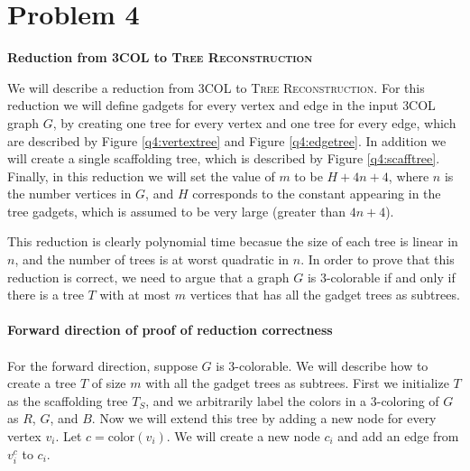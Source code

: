 \newcommand{\tr}{\textsc{Tree Reconstruction}\xspace}
\newcommand{\tc}{\textsc{3COL}\xspace}

\section*{Problem 4}

{\bf Reduction from \tc to \tr}

We will describe a reduction from \tc to \tr. For this reduction we
will define gadgets for every vertex and edge in the input \tc graph
$G$, by creating one tree for every vertex and one tree for every
edge, which are described by Figure \ref{q4:vertextree}
and Figure \ref{q4:edgetree}.
In addition we will create a single scaffolding tree, which is
described by Figure \ref{q4:scafftree}. Finally, in this
reduction we will set the value of $m$ to be $H + 4n + 4$,
where $n$ is the number vertices in $G$, and $H$ corresponds
to the constant appearing in the tree gadgets, which is assumed
to be very large (greater than $4n + 4$).

This reduction is clearly polynomial time becasue the size of
each tree is linear in $n$, and the number of trees is at worst
quadratic in $n$. In order to prove that this reduction is correct,
we need to argue that a graph $G$ is 3-colorable if and only if there
is a tree $T$ with at most $m$ vertices that has all the gadget trees
as subtrees.\\ 
\\
{\bf Forward direction of proof of reduction correctness}\\
\\
For the forward direction, suppose $G$ is 3-colorable. We will
describe how to create a tree $T$ of size $m$ with all the gadget
trees as subtrees. First we initialize $T$ as the scaffolding
tree $T_S$, and we arbitrarily label the colors in a 3-coloring
of $G$ as $R$, $G$, and $B$. Now we will extend this tree
by adding a new node for every vertex $v_i$. Let $c = \text{color}(v_i)$.
We will create a new node $c_i$ and
add an edge from $v_i^c$ to $c_i$.

